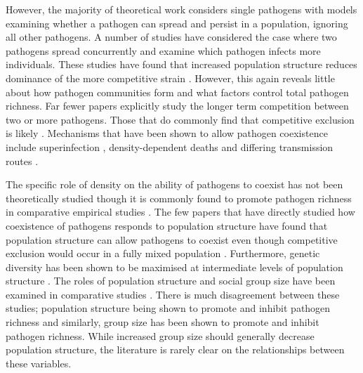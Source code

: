 However, the majority of theoretical work considers single pathogens with models examining whether a pathogen can spread and persist in a population, ignoring all other pathogens.
A number of studies have considered the case where two pathogens spread concurrently and examine which pathogen infects more individuals.
These studies have found that increased population structure reduces dominance of the more competitive strain \cite{van2014domination, poletto2013host, poletto2015characterising}.
However, this again reveals little about how pathogen communities form and what factors control total pathogen richness.
Far fewer papers explicitly study the longer term competition between two or more pathogens.
Those that do commonly find that competitive exclusion is likely \cite{castillo1995dynamics, bremermann1989competitive, martcheva2013competitive, ackleh2003competitive, ackleh2014robust, turner2002impact}.
Mechanisms that have been shown to allow pathogen coexistence include superinfection \cite{may1994superinfection, li2010age}, density-dependent deaths \cite{ackleh2003competitive, kirupaharan2004coexistence} and differing transmission routes \cite{allen2003dynamics}.

The specific role of density on the ability of pathogens to coexist has not been theoretically studied though it is commonly found to promote pathogen richness in comparative empirical studies \cite{kamiya2014determines, nunn2003comparative, arneberg2002host}.
The few papers that have directly studied how coexistence of pathogens responds to population structure have found that population structure can allow pathogens to coexist even though competitive exclusion would occur in a fully mixed population \cite{qiu2013vector, allen2004sis, nunes2006localized}.
Furthermore, genetic diversity has been shown to be maximised at intermediate levels of population structure \cite{campos2006pathogen}.
The roles of population structure and social group size have been examined in comparative studies \cite{maganga2014bat, gay2014parasite, turmelle2009correlates, altizer2003social, bordes2007rodent, ezenwa2006host, rifkin2012animals, vitone2004body}.
There is much disagreement between these studies; population structure being shown to promote \cite{maganga2014bat, turmelle2009correlates} and inhibit pathogen richness \cite{gay2014parasite} and similarly, group size has been shown to promote \cite{rifkin2012animals, bordes2007rodent} and inhibit \cite{ezenwa2006host} pathogen richness.
While increased group size should generally decrease population structure, the literature is rarely clear on the relationships between these variables.



